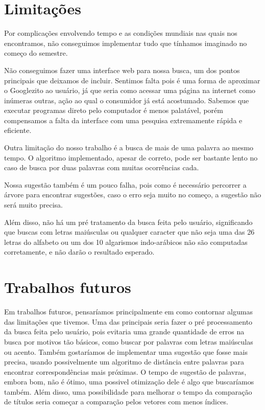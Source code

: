 \documentclass{article}
\begin{document}
\section{Limitações}

Por complicações envolvendo tempo e as condições mundiais nas quais nos encontramos, não conseguimos implementar tudo que tínhamos imaginado no começo do semestre. 

Não conseguimos fazer uma interface web para nossa busca, um dos pontos principais que deixamos de incluir. Sentimos falta pois é uma forma de aproximar o Googlezito ao usuário, já que seria como acessar uma página na internet como inúmeras outras, ação ao qual o consumidor já está acostumado. Sabemos que executar programas direto pelo computador é menos palatável, porém compensamos a falta da interface com uma pesquisa extremamente rápida e eficiente.

Outra limitação do nosso trabalho é a busca de mais de uma palavra ao mesmo tempo. O algoritmo implementado, apesar de correto, pode ser bastante lento no caso de busca por duas palavras com muitas ocorrências cada. 

Nossa sugestão também é um pouco falha, pois como é necessário percorrer a árvore para encontrar sugestões, caso o erro seja muito no começo, a sugestão não será muito precisa.

Além disso, não há um pré tratamento da busca feita pelo usuário, significando que buscas com letras maiúsculas ou qualquer caracter que não seja uma das 26 letras do alfabeto ou um dos 10 algarismos indo-arábicos não são computadas corretamente, e não darão o resultado esperado.



\section{Trabalhos futuros}

Em trabalhos futuros, pensaríamos principalmente em como contornar algumas das limitações que tivemos. Uma das principais seria fazer o pré processamento da busca feita pelo usuário, pois evitaria uma grande quantidade de erros na busca por motivos tão básicos, como buscar por palavras com letras maiúsculas ou acento. Também gostaríamos de implementar uma sugestão que fosse mais precisa, usando possivelmente um algoritmo de distância entre palavras para encontrar correspondências mais próximas. O tempo de sugestão de palavras, embora bom, não é ótimo, uma possivel otimização dele é algo que buscaríamos também. Além disso, uma possibilidade para melhorar o tempo da comparação de títulos seria começar a comparação pelos vetores com menos índices.
\end{document}

